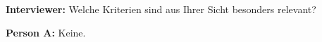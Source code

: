 
\textbf{Interviewer:} Welche Kriterien sind aus Ihrer Sicht besonders relevant?

\textbf{Person A:} Keine.
